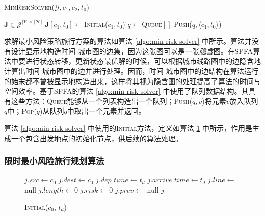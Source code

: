 \begin{algorithm}[t]
\caption{\textsc{MinRiskSolver}($\mathcal G, c_1, c_2, t_0$)}
\label{algo:min-risk-solver}
$\bm J \in \mathcal J^{ |\mathcal V| \times |\mathcal H| }$\;
$\bm J[c_1, t_0] \gets $\textsc{Initial}($c_1, t_0$)\;
$q \gets $\textsc{Queue}$[ ]$\;
\textsc{Push}($q, \langle c_1, t_0 \rangle$)\;
\end{algorithm}

求解最小风险策略旅行方案的算法如算法 \ref{algo:min-risk-solver} 中所示。算法并没有设计显示地构造时间-城市图的边集，因为这张图可以是一张\emph{隐含}图。在SPFA算法中要进行状态转移，更新状态最优解的时候，可以根据城市线路图中的边隐含地计算出时间-城市图中的边并进行处理。因而，时间-城市图中的边结构在算法运行的始末都不曾被显示地构造出来，这样将其视为隐含图的处理提高了算法的时间与空间效率。基于SPFA的算法 \ref{algo:min-risk-solver} 中使用了队列数据结构。其具有这些方法：\textsc{Queue}能够从一个列表构造出一个队列；\textsc{Push}($q, v$)将元素$v$放入队列$q$中；\textsc{Pop}($q$)从队列$q$中取出一个元素并返回。

算法 \ref{algo:min-risk-solver} 中使用的\textsc{Initial}方法，定义如算法 \ref{algo:initial} 中所示，作用是生成一个包含出发地点的初始化节点，供后续的算法处理。

\subsubsection{限时最小风险旅行规划算法}

\begin{figure}
\begin{minipage}{0.5\textwidth}
\begin{algorithm}[H]
\caption{\textsc{Initial}($c_0$, $t_d$)}
\label{algo:initial}
$j.src \gets c_0$\;
$j.dest \gets c_0$\;
$j.dep\_time \gets t_d$\;
$j.arrive\_time \gets t_d$\;
$j.line \gets $ null\;
$j.length \gets 0$\;
$j.risk \gets 0$\;
$j.prev \gets $ null\;
\Return $j$\;
\end{algorithm}
\end{minipage}
\end{figure}

